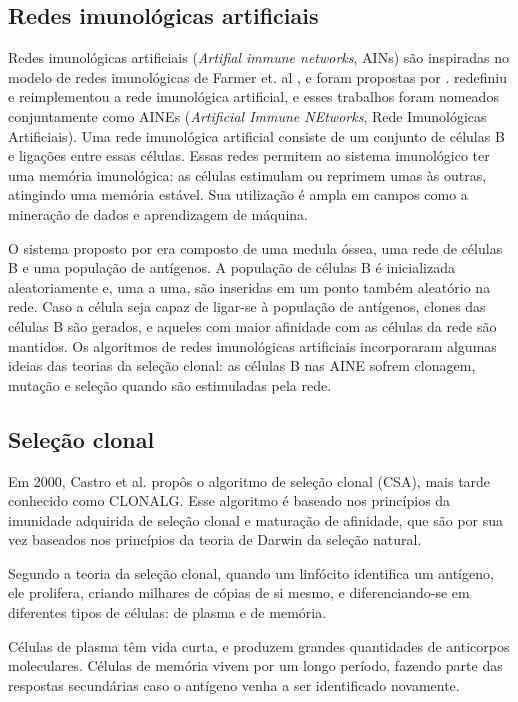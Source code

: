 \subsection{Redes imunológicas artificiais}

Redes imunológicas artificiais (\emph{Artifial immune networks}, AINs) são inspiradas no modelo de redes imunológicas de Farmer et. al \cite{Farmer1986}, e foram propostas por \cite{Ishida1990}. \cite{Timmis2000} redefiniu e reimplementou a rede imunológica artificial, e esses trabalhos foram nomeados conjuntamente como AINEs (\emph{Artificial Immune NEtworks}, Rede Imunológicas Artificiais). Uma rede imunológica artificial consiste de um conjunto de células B e ligações entre essas células. Essas redes permitem ao sistema imunológico ter uma memória imunológica: as células estimulam ou reprimem umas às outras, atingindo uma memória estável. Sua utilização é ampla em campos como a mineração de dados e aprendizagem de máquina. 

O sistema proposto por \citeauthor{Timmis2000} era composto de uma medula óssea, uma rede de células B e uma população de antígenos. A população de células B é inicializada aleatoriamente e, uma a uma, são inseridas em um ponto também aleatório na rede. Caso a célula seja capaz de ligar-se à população de antígenos, clones das células B são gerados, e aqueles com maior afinidade com as células da rede são mantidos. Os algoritmos de redes imunológicas artificiais incorporaram algumas ideias das teorias da seleção clonal: as células B nas AINE sofrem clonagem, mutação e seleção quando são estimuladas pela rede.

\subsection{Seleção clonal}

Em 2000, Castro et al.\cite{Castro2000} propôs o algoritmo de seleção clonal (CSA), mais tarde conhecido como CLONALG. Esse algoritmo é baseado nos princípios da imunidade adquirida de seleção clonal e maturação de afinidade, que são por sua vez baseados nos princípios da teoria de Darwin da seleção natural.

Segundo a teoria da seleção clonal, quando um linfócito identifica um antígeno, ele prolifera, criando milhares de cópias de si mesmo, e diferenciando-se em diferentes tipos de células: de plasma e de memória.

Células de plasma têm vida curta, e produzem grandes quantidades de anticorpos moleculares. Células de memória vivem por um longo período, fazendo parte das respostas secundárias caso o antígeno venha a ser identificado novamente.

